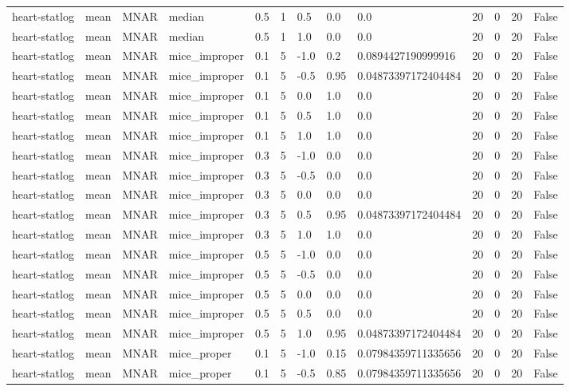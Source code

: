 \begin{tabular}{lllllllllllll}
heart-statlog & mean & MNAR & median & 0.5 & 1 & 0.5 & 0.0 & 0.0 & 20 & 0 & 20 & False \\
heart-statlog & mean & MNAR & median & 0.5 & 1 & 1.0 & 0.0 & 0.0 & 20 & 0 & 20 & False \\
heart-statlog & mean & MNAR & mice\_improper & 0.1 & 5 & -1.0 & 0.2 & 0.0894427190999916 & 20 & 0 & 20 & False \\
heart-statlog & mean & MNAR & mice\_improper & 0.1 & 5 & -0.5 & 0.95 & 0.04873397172404484 & 20 & 0 & 20 & False \\
heart-statlog & mean & MNAR & mice\_improper & 0.1 & 5 & 0.0 & 1.0 & 0.0 & 20 & 0 & 20 & False \\
heart-statlog & mean & MNAR & mice\_improper & 0.1 & 5 & 0.5 & 1.0 & 0.0 & 20 & 0 & 20 & False \\
heart-statlog & mean & MNAR & mice\_improper & 0.1 & 5 & 1.0 & 1.0 & 0.0 & 20 & 0 & 20 & False \\
heart-statlog & mean & MNAR & mice\_improper & 0.3 & 5 & -1.0 & 0.0 & 0.0 & 20 & 0 & 20 & False \\
heart-statlog & mean & MNAR & mice\_improper & 0.3 & 5 & -0.5 & 0.0 & 0.0 & 20 & 0 & 20 & False \\
heart-statlog & mean & MNAR & mice\_improper & 0.3 & 5 & 0.0 & 0.0 & 0.0 & 20 & 0 & 20 & False \\
heart-statlog & mean & MNAR & mice\_improper & 0.3 & 5 & 0.5 & 0.95 & 0.04873397172404484 & 20 & 0 & 20 & False \\
heart-statlog & mean & MNAR & mice\_improper & 0.3 & 5 & 1.0 & 1.0 & 0.0 & 20 & 0 & 20 & False \\
heart-statlog & mean & MNAR & mice\_improper & 0.5 & 5 & -1.0 & 0.0 & 0.0 & 20 & 0 & 20 & False \\
heart-statlog & mean & MNAR & mice\_improper & 0.5 & 5 & -0.5 & 0.0 & 0.0 & 20 & 0 & 20 & False \\
heart-statlog & mean & MNAR & mice\_improper & 0.5 & 5 & 0.0 & 0.0 & 0.0 & 20 & 0 & 20 & False \\
heart-statlog & mean & MNAR & mice\_improper & 0.5 & 5 & 0.5 & 0.0 & 0.0 & 20 & 0 & 20 & False \\
heart-statlog & mean & MNAR & mice\_improper & 0.5 & 5 & 1.0 & 0.95 & 0.04873397172404484 & 20 & 0 & 20 & False \\
heart-statlog & mean & MNAR & mice\_proper & 0.1 & 5 & -1.0 & 0.15 & 0.07984359711335656 & 20 & 0 & 20 & False \\
heart-statlog & mean & MNAR & mice\_proper & 0.1 & 5 & -0.5 & 0.85 & 0.07984359711335656 & 20 & 0 & 20 & False \\

\end{tabular}
